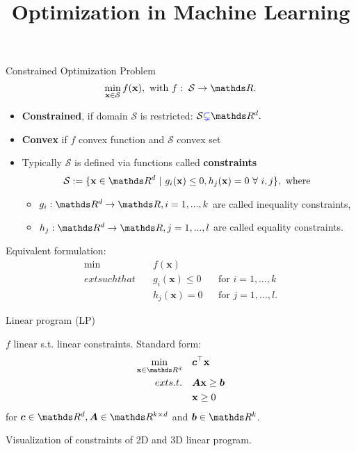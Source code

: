 \documentclass[11pt,compress,t,notes=noshow, xcolor=table]{beamer}
\title{Optimization in Machine Learning}
\begin{document}


\begin{frame2}{Constrained Optimization Problem}
$$
\min_{\xv \in \mathcal{S}} \fx, \text{ with } f: \; \mathcal{S} \to \R.
$$
\begin{itemize}
\item \textbf{Constrained}, if domain $\mathcal{S}$ is restricted: $\mathcal{S} \textcolor{blue}{\subsetneq} \R^d.$
\item \textbf{Convex} if $f$ convex function and $\mathcal{S}$ convex set
\item Typically $\mathcal{S}$ is defined via functions called \textbf{constraints}
$$
\mathcal{S}:= \{\xv \in \R^d ~|~ g_i(\xv) \le 0, h_j(\xv) = 0 ~\forall~ i, j\}, \text{ where }
$$
\begin{itemize}
\item $g_i: \R^d \to \R, i = 1, ..., k$ are called inequality constraints,
\item $h_j: \R^d \to \R, j = 1, ..., l$ are called equality constraints.
\end{itemize}
\end{itemize}
\spacer
Equivalent formulation:
$$
\begin{aligned}
\min \quad & f(\mathbf{x})  \\
ext{such that} \quad & g_i(\mathbf{x}) \le 0 && \text{for } i=1,\ldots,k \\
& h_j(\mathbf{x}) = 0 && \text{for } j=1,\ldots,l.
\end{aligned}
$$
\end{frame2}


\begin{framei}{Linear program (LP)}
\item $f$ linear s.t. linear constraints. Standard form:
$$
\begin{aligned}
\min_{\xv \in \R^d} \quad & \bm{c}^\top \xv \\
ext{s.t. } \quad & \bm{A}\xv \ge \bm{b} \\
& \xv \ge 0
\end{aligned}
$$
for $\bm{c}\in \R^d, \bm{A} \in \R^{k \times d}$ and $\bm{b} \in \R^k$.
\begin{center}\begin{footnotesize}
Visualization of constraints of 2D and 3D linear program.
\end{footnotesize}\end{center}
\end{framei}
\end{document}

